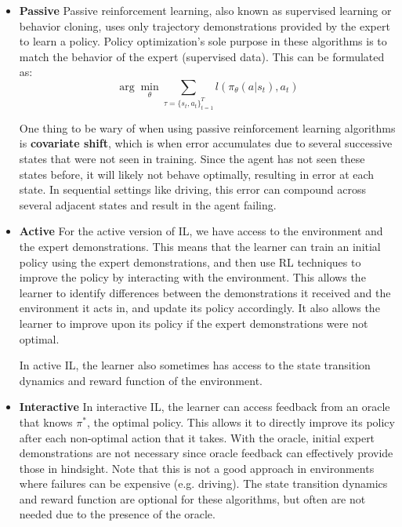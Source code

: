 \documentclass[11pt]{article}
\begin{document}
\begin{itemize}
    \item \textbf{Passive}
    Passive reinforcement learning, also known as supervised learning or behavior cloning, uses only trajectory demonstrations provided by the expert to learn a policy. Policy optimization's sole purpose in these algorithms is to match the behavior of the expert (supervised data). This can be formulated as:
    \begin{equation}
    \arg\min_\theta\sum_{\tau=\{s_t,a_t\}_{t=1}^T} l(\pi_\theta(a|s_t), a_t)
    \end{equation}
    
    One thing to be wary of when using passive reinforcement learning algorithms is \textbf{covariate shift}, which is when error accumulates due to several successive states that were not seen in training. Since the agent has not seen these states before, it will likely not behave optimally, resulting in error at each state. In sequential settings like driving, this error can compound across several adjacent states and result in the agent failing.  
    
    \item \textbf{Active}
    For the active version of IL, we have access to the environment and the expert demonstrations. This means that the learner can train an initial policy using the expert demonstrations, and then use RL techniques to improve the policy by interacting with the environment. This allows the learner to identify differences between the demonstrations it received and the environment it acts in, and update its policy accordingly. It also allows the learner to improve upon its policy if the expert demonstrations were not optimal.
    
    In active IL, the learner also sometimes has access to the state transition dynamics and reward function of the environment. 
    
    \item \textbf{Interactive}
    In interactive IL, the learner can access feedback from an oracle that knows $\pi^*$, the optimal policy. This allows it to directly improve its policy after each non-optimal action that it takes. With the oracle, initial expert demonstrations are not necessary since oracle feedback can effectively provide those in hindsight. Note that this is not a good approach in environments where failures can be expensive (e.g. driving). The state transition dynamics and reward function are optional for these algorithms, but often are not needed due to the presence of the oracle.
    
\end{itemize}
\end{document}
